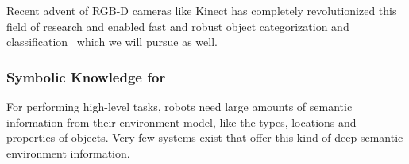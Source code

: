 

Recent advent of RGB-D cameras like Kinect has completely revolutionized this field of research
and enabled fast and robust object categorization and classification~\cite{Lai_sparsedistance} which
we will pursue as well.
\subsubsection{Symbolic Knowledge for \ksem}
\label{sec:knowledge-representation}
For performing high-level tasks, robots need large amounts of semantic information from their environment model,
like the types, locations and properties of objects. Very few systems exist that offer this kind
of deep semantic environment information.

